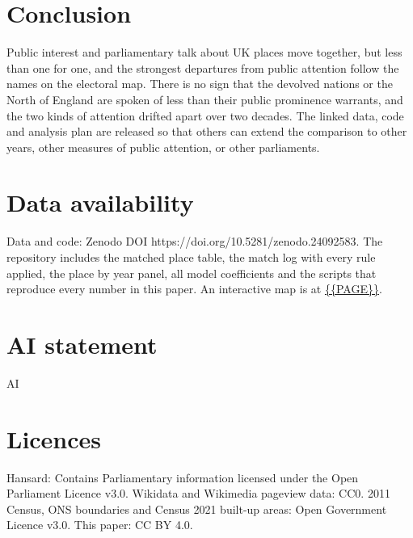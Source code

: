 \documentclass[11pt,a4paper]{article}
\begin{document}
\section{Conclusion}
Public interest and parliamentary talk about UK places move together, but less than one for one, and the strongest departures from public attention follow the names on the electoral map. There is no sign that the devolved nations or the North of England are spoken of less than their public prominence warrants, and the two kinds of attention drifted apart over two decades. The linked data, code and analysis plan are released so that others can extend the comparison to other years, other measures of public attention, or other parliaments.

\section*{Data availability}
Data and code: Zenodo DOI https://doi.org/10.5281/zenodo.24092583. The repository includes the matched place table, the match log with every rule applied, the place by year panel, all model coefficients and the scripts that reproduce every number in this paper. An interactive map is at \url{{{PAGE}}}.

\section*{AI statement}
{{AI}}

\section*{Licences}
Hansard: Contains Parliamentary information licensed under the Open Parliament Licence v3.0. Wikidata and Wikimedia pageview data: CC0. 2011 Census, ONS boundaries and Census 2021 built-up areas: Open Government Licence v3.0. This paper: CC BY 4.0.
\end{document}
